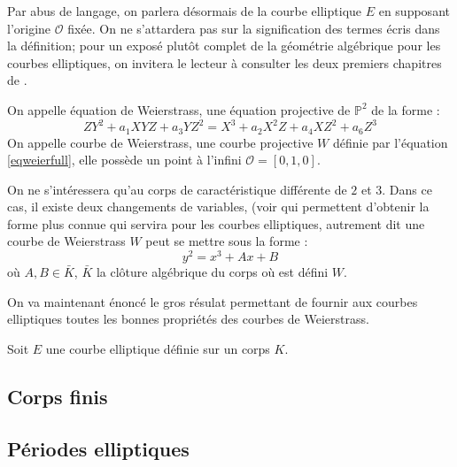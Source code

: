 \documentclass[a4paper]{article} %
\numberwithin{section}{part}
\numberwithin{equation}{section}
\newcommand\EO{\mathcal{O}}
\newcommand\PP[1]{\mathbb{P}^{#1}}
\begin{document}
Par abus de langage, on parlera désormais de la courbe elliptique $E$ en
supposant l'origine $\EO$ fixée. On ne s'attardera pas sur la signification des
termes écris dans la définition; pour un exposé plutôt complet de la géométrie 
algébrique pour les courbes elliptiques, on invitera le lecteur à consulter les
deux premiers chapitres de \cite{Sil}.

\begin{defn} 
On appelle équation de Weierstrass, une équation projective de $\PP{2}$ de la
forme :
\begin{equation}
\label{eqweierfull}
ZY^2 + a_1XYZ + a_3YZ^2 = X^3 + a_2X^2Z + a_4XZ^2 + a_6Z^3
\end{equation}
On appelle courbe de Weierstrass, une courbe projective $W$ définie par 
l'équation \ref{eqweierfull}, elle possède un point à l'infini $\EO = 
[0, 1, 0]$.
\end{defn}

On ne s'intéressera qu'au corps de caractéristique différente de $2$ et $3$. 
Dans ce cas, il existe deux changements de variables, (voir \cite[Chap. III,
p.~42]{Sil} qui permettent d'obtenir la forme plus connue qui servira pour les 
courbes elliptiques, autrement dit une courbe de Weierstrass $W$ peut se mettre 
sous la forme :
\begin{equation}
\label{eqweiersimpl}
y^2 = x^3 + Ax + B
\end{equation}
où $A, B\in\bar{K}$, $\bar{K}$ la clôture algébrique du corps où est défini
$W$.\par

On va maintenant énoncé le gros résulat permettant de fournir aux courbes
elliptiques toutes les bonnes propriétés des courbes de Weierstrass.

\begin{prop}
Soit $E$ une courbe elliptique définie sur un corps $K$.
\end{prop}





\subsection{Corps finis}

\subsection{Périodes elliptiques}
\end{document}
